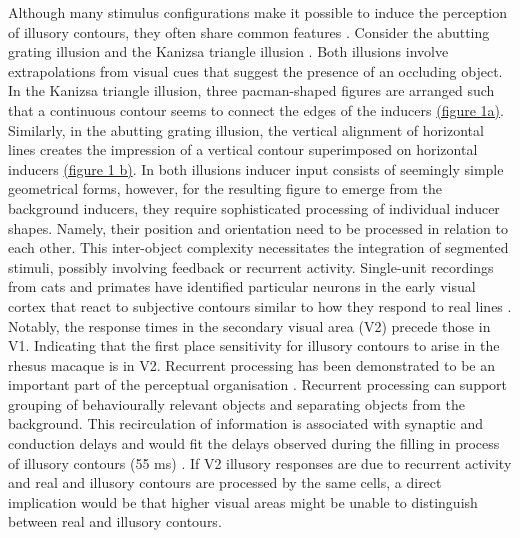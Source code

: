 \documentclass[12pt]{article}
\begin{document}
\bigbreak
Although many stimulus configurations make it possible to induce the perception of illusory contours, they often share common features \autocite{palmerLateInfluencesPerceptual2000}. Consider the abutting grating illusion \autocite{sorianoAbuttingGratingIllusion1996} and the Kanizsa triangle illusion \autocite{kanizsaSubjectiveContours1976}. Both illusions involve extrapolations from visual cues that suggest the presence of an occluding object. In the Kanizsa triangle illusion, three pacman-shaped figures are arranged such that a continuous contour seems to connect the edges of the inducers \hyperref[fig:figure_1]{(figure 1a)}. Similarly, in the abutting grating illusion, the vertical alignment of horizontal lines creates the impression of a vertical contour superimposed on horizontal inducers \hyperref[fig:figure_1]{(figure 1 b)}. In both illusions inducer input consists of seemingly simple geometrical forms, however, for the resulting figure to emerge from the background inducers, they require sophisticated processing of individual inducer shapes. Namely, their position and orientation need to be processed in relation to each other. This inter-object complexity necessitates the integration of segmented stimuli, possibly involving feedback or recurrent activity. Single-unit recordings from cats and primates have identified particular neurons in the early visual cortex that react to subjective contours similar to how they respond to real lines \autocite{leeDynamicsSubjectiveContour2001,vonderheydtMechanismsContourPerception1989}. Notably, the response times in the secondary visual area (V2) precede those in V1. Indicating that the first place sensitivity for illusory contours to arise in the rhesus macaque is in V2. Recurrent processing has been demonstrated to be an important part of the perceptual organisation \autocite{roelfsemaCORTICALALGORITHMSPERCEPTUAL2006}. Recurrent processing can support grouping of behaviourally relevant objects and separating objects from the background. This recirculation of information is associated with synaptic and conduction delays and would fit the delays observed during the filling in process of illusory contours (55 ms) \autocite{leeDynamicsSubjectiveContour2001,pakTopDownFeedbackControls2020}. If V2 illusory responses are due to recurrent activity and real and illusory contours are processed by the same cells, a direct implication would be that higher visual areas might be unable to distinguish between real and illusory contours.
\end{document}

